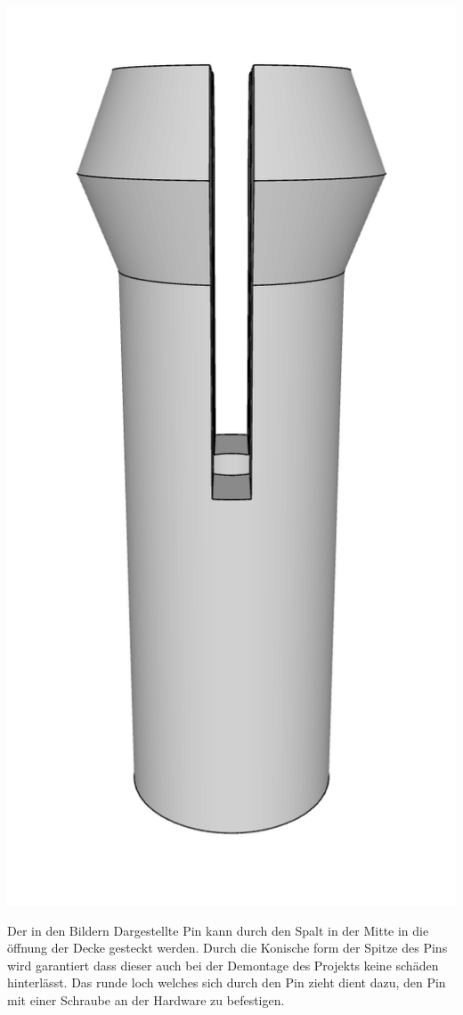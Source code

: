 \begin{center}
\begin{minipage}[b]{0.32\textwidth}
    \includegraphics[width=\textwidth]{../images/3DPrinting/Pin3.png}
  \end{minipage}
\end{center}

Der in den Bildern Dargestellte Pin kann durch den Spalt in der Mitte in die öffnung der Decke gesteckt werden.
Durch die Konische form der Spitze des Pins wird garantiert dass dieser auch bei der Demontage des Projekts keine schäden hinterlässt.
Das runde loch welches sich durch den Pin zieht dient dazu, den Pin mit einer Schraube an der Hardware zu befestigen.

